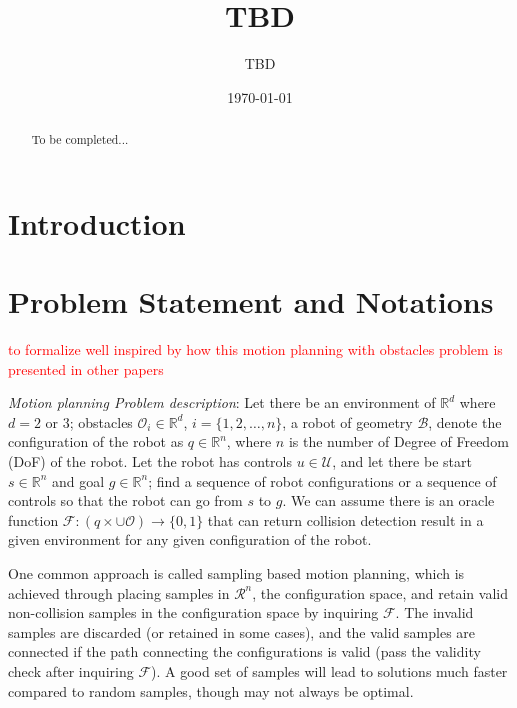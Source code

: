 \documentclass[11pt]{article}
\begin{document}
\title{TBD}

\author{
TBD
}

\date{\today}

\maketitle

\begin{abstract}
To be completed...
\end{abstract}

\section{Introduction}\label{sec:introduction}



\section{Problem Statement and Notations}\label{sec:notations}

\textcolor{red}{to formalize well inspired by how this motion planning with obstacles problem is presented in other papers}

\noindent\textit{Motion planning Problem description}: Let there be an environment of $\mathbb{R}^d$ where $d = 2$ or $3$; obstacles $\mathcal{O}_i\in\mathbb{R}^d$, $i = \{1, 2, \ldots, n\}$, a robot of geometry $\mathcal{B}$, denote the configuration of the robot as $q\in\mathbb{R}^n$, where $n$ is the number of Degree of Freedom (DoF) of the robot. Let the robot has controls $u\in\mathcal{U}$, and let there be start $s\in\mathbb{R}^n$ and goal $g\in\mathbb{R}^n$; find a sequence of robot configurations or a sequence of controls so that the robot can go from $s$ to $g$. We can assume there is an oracle function $\mathcal{F}:(q\times \cup\mathcal{O})\rightarrow \{0, 1\}$ that can return collision detection result in a given environment for any given configuration of the robot. 

One common approach is called sampling based motion planning, which is achieved through placing samples in $\mathcal{R}^n$, the configuration space, and retain valid non-collision samples in the configuration space by inquiring $\mathcal{F}$. The invalid samples are discarded (or retained in some cases), and the valid samples are connected if the path connecting the configurations is valid (pass the validity check after inquiring $\mathcal{F}$). A good set of samples will lead to solutions much faster compared to random samples, though may not always be optimal. 
\end{document}
